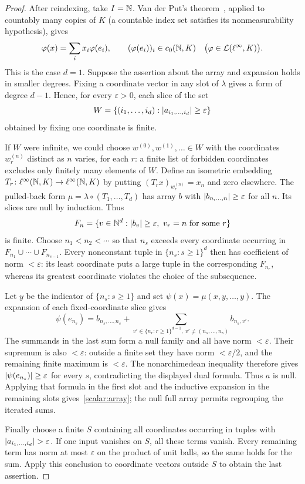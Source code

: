 \begin{proof}
After reindexing, take $I=\mathbb N$. Van der Put's theorem~\cite[Th\'eor\`eme~4.1]{VdP}, applied to countably
many copies of $K$ (a countable index set satisfies its nonmeasurability hypothesis), gives
\[
 \varphi(x)=\sum_i x_i\varphi(e_i),\qquad (\varphi(e_i))_i\in c_0(\mathbb N,K)
 \quad\bigl(\varphi\in\mathcal L(\ell^\infty,K)\bigr).
\]
This is the case $d=1$. Suppose the assertion about the array and expansion holds in smaller degrees.
Fixing a coordinate vector in any slot of $\lambda$ gives a form of degree $d-1$. Hence, for every
$\varepsilon>0$, each slice of the set
\[
 W=\{(i_1,\dots,i_d):\lvert a_{i_1,\dots,i_d}\rvert\ge\varepsilon\}
\]
obtained by fixing one coordinate is finite.

If $W$ were infinite, we could choose $w^{(0)},w^{(1)},\ldots\in W$ with the coordinates
$w^{(n)}_r$ distinct as $n$ varies, for each $r$: a finite list of forbidden coordinates excludes only
finitely many elements of $W$. Define an isometric embedding $T_r\colon\ell^\infty(\mathbb N,K)\to\ell^\infty(\mathbb N,K)$
by putting $(T_rx)_{w^{(n)}_r}=x_n$ and zero elsewhere. The pulled-back form
$\mu=\lambda\circ(T_1,\dots,T_d)$ has array $b$ with $\lvert b_{n,\dots,n}\rvert\ge\varepsilon$ for all $n$.
Its slices are null by induction. Thus
\[
 F_n=\{v\in\N^d:\abs{b_v}\ge\varepsilon,\ v_r=n\text{ for some }r\}
\]
is finite. Choose $n_1<n_2<\cdots$ so that $n_s$ exceeds every coordinate occurring in
$F_{n_1}\cup\cdots\cup F_{n_{s-1}}$. Every nonconstant tuple in $\{n_s:s\ge1\}^d$ then has coefficient
of norm $<\varepsilon$: its least coordinate puts a large tuple in the corresponding $F_{n_r}$,
whereas its greatest coordinate violates the choice of the subsequence.

Let $y$ be the indicator of $\{n_s:s\ge1\}$ and set $\psi(x)=\mu(x,y,\dots,y)$. The expansion of each
fixed-coordinate slice gives
\[
 \psi(e_{n_s})
 =b_{n_s,\dots,n_s}
   +\sum_{v'\in\{n_r:r\ge1\}^{d-1},\ v'\ne(n_s,\dots,n_s)}b_{n_s,v'}.
\]
The summands in the last sum form a null family and all have norm $<\varepsilon$. Their supremum is
also $<\varepsilon$: outside a finite set they have norm $<\varepsilon/2$, and the remaining finite
maximum is $<\varepsilon$. The nonarchimedean inequality therefore gives
$\lvert \psi(e_{n_s})\rvert\ge\varepsilon$ for every $s$, contradicting the displayed dual formula.
Thus $a$ is null. Applying that formula in the first slot and the inductive expansion in the remaining
slots gives~\eqref{scalar:array}; the null full array permits regrouping the iterated sums.

Finally choose a finite $S$ containing all coordinates occurring in tuples with $\lvert a_{i_1,\dots,i_d}\rvert
>\varepsilon$. If one input vanishes on $S$, all these terms vanish. Every remaining term has norm at
most $\varepsilon$ on the product of unit balls, so the same holds for the sum. Apply this conclusion to
coordinate vectors outside $S$ to obtain the last assertion.
\end{proof}


